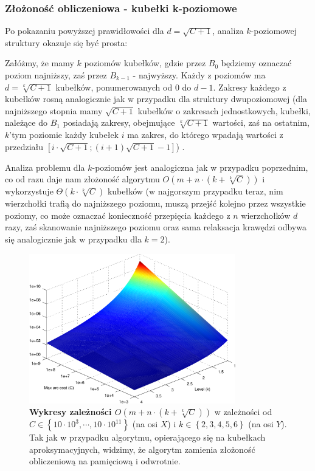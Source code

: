 \subsubsection{Złożoność obliczeniowa - kubełki k-poziomowe}

Po pokazaniu powyższej prawidłowości dla $d = \sqrt{C+1}$, analiza $k$-poziomowej struktury okazuje się być prosta:

Załóżmy, że mamy $k$ poziomów kubełków, gdzie przez $B_{0}$ będziemy oznaczać poziom najniższy, zaś przez $B_{k-1}$ - najwyższy. Każdy z poziomów ma $d = \sqrt[k]{C+1}$ kubełków, ponumerowanych od $0$ do $d-1$. Zakresy każdego z kubełków rosną analogicznie jak w przypadku dla struktury dwupoziomowej (dla najniższego stopnia mamy $\sqrt{C+1}$ kubełków o zakresach jednostkowych, kubełki, należące do $B_{1}$ posiadają zakresy, obejmujące $\sqrt[k]{C+1}$ wartości, zaś na ostatnim, $k$'tym poziomie każdy kubełek $i$ ma zakres, do którego wpadają wartości z przedziału $ \left[ i \cdot \sqrt{C+1} ; \left( i + 1 \right) \sqrt{C+1} - 1 \right]$) \cite[295]{CAN2001}.

Analiza problemu dla $k$-poziomów jest analogiczna jak w przypadku poprzednim, co od razu daje nam złożoność algorytmu $ O \left( m + n \cdot \left( k + \sqrt[k]{C} \right) \right)$ i wykorzystuje $ \Theta \left( k \cdot \sqrt[k]{C} \right)$ kubełków (w najgorszym przypadku teraz, nim wierzchołki trafią do najniższego poziomu, muszą przejść kolejno przez wszystkie poziomy, co może oznaczać konieczność przepięcia każdego z $n$ wierzchołków $d$ razy, zaś skanowanie najniższego poziomu oraz sama relaksacja krawędzi odbywa się analogicznie jak w przypadku dla $k=2$).

\begin{figure}[!htbp]
	\centering
	\includegraphics[width=0.8\textwidth]{Chapter_II/K-LEVEL-BUCKETS-Other/kLevel3DPlot.pdf}
	\caption{}
	\caption{\textbf{Wykresy zależności $ O \left( m + n \cdot \left( k + \sqrt[k]{C} \right) \right) $ } w zależności od $C \in \left\{ 10 \cdot 10^{3}, \cdots, 10 \cdot 10^{11} \right\}$ (na osi $X$) i $k \in \left\{ 2, 3, 4, 5, 6 \right\}$ (na osi $Y$). Tak jak w przypadku algorytmu, opierającego się na kubełkach aproksymacyjnych, widzimy, że algorytm zamienia złożoność obliczeniową na pamięciową i odwrotnie. }\label{fig:plotKLevelBucketsComplexity}
\end{figure}

